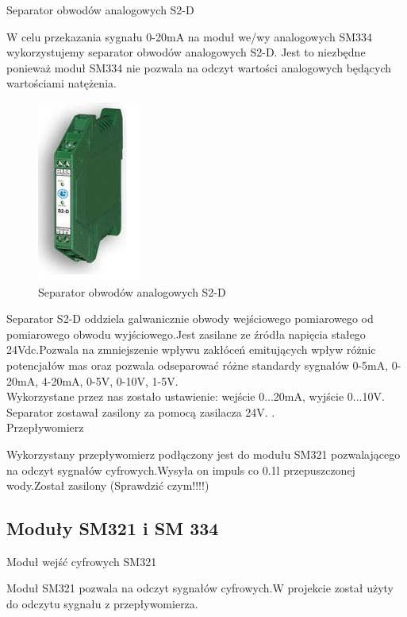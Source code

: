 \selectfont
Separator obwodów analogowych S2-D
\selectfont

W celu przekazania sygnału 0-20mA na moduł we/wy analogowych SM334 wykorzystujemy separator obwodów analogowych S2-D.
Jest to niezbędne ponieważ moduł SM334 nie pozwala na odczyt wartości analogowych będących wartościami natężenia.

\begin{figure}[h]
\centering
\includegraphics[scale=1.3]{Zdjecia/Stanowiska/4_Pompa/SD-2.jpg}
\caption{Separator obwodów analogowych S2-D}
\end{figure}
\newpage
Separator S2-D oddziela galwanicznie obwody wejściowego pomiarowego od pomiarowego obwodu wyjściowego.Jest  zasilane ze źródła napięcia stałego 24Vdc.Pozwala na zmniejszenie wpływu zakłóceń emitujących wpływ różnic potencjałów mas oraz pozwala odseparować różne standardy sygnałów 0-5mA, 0-20mA, 4-20mA, 0-5V, 0-10V, 1-5V.
\\Wykorzystane przez nas zostało ustawienie: wejście 0...20mA, wyjście 0...10V. Separator zostawał zasilony za pomocą zasilacza 24V.
\cite{diduce:SD-2}.\\

\selectfont
Przepływomierz
\selectfont

Wykorzystany przepływomierz podłączony jest do modułu SM321 pozwalającego na odczyt sygnałów cyfrowych.Wysyła on impuls co 0.1l przepuszczonej wody.Został zasilony (Sprawdzić czym!!!!)
\subsection{Moduły SM321 i SM 334}
\selectfont
Moduł wejść cyfrowych SM321
\selectfont

Moduł SM321 pozwala na odczyt sygnałów cyfrowych.W projekcie został użyty do odczytu sygnału z przepływomierza.

